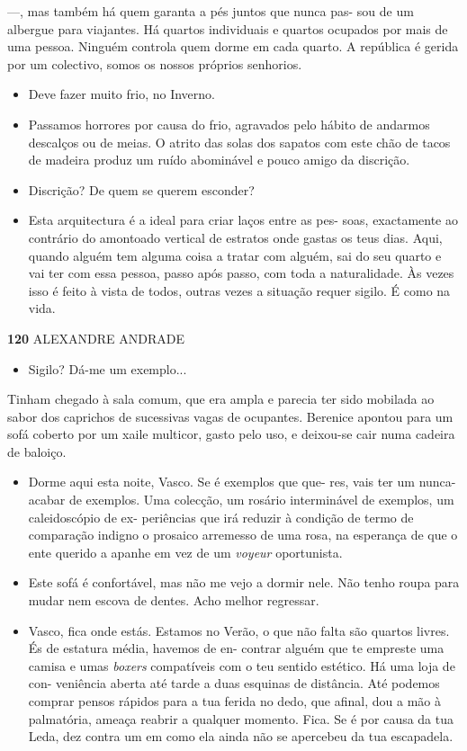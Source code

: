 ---, mas também há quem garanta a pés juntos que nunca pas- sou de um
albergue para viajantes. Há quartos individuais e quartos ocupados por
mais de uma pessoa. Ninguém controla quem dorme em cada quarto. A
república é gerida por um colectivo, somos os nossos próprios senhorios.

\begin{itemize}
\tightlist
\item
  Deve fazer muito frio, no Inverno.
\item
  Passamos horrores por causa do frio, agravados pelo hábito de andarmos
  descalços ou de meias. O atrito das solas dos sapatos com este chão de
  tacos de madeira produz um ruído abominável e pouco amigo da
  discrição.
\item
  Discrição? De quem se querem esconder?
\item
  Esta arquitectura é a ideal para criar laços entre as pes- soas,
  exactamente ao contrário do amontoado vertical de estratos onde gastas
  os teus dias. Aqui, quando alguém tem alguma coisa a tratar com
  alguém, sai do seu quarto e vai ter com essa pessoa, passo após passo,
  com toda a naturalidade. Às vezes isso é feito à vista de todos,
  outras vezes a situação requer sigilo. É como na vida.
\end{itemize}

\textbf{120 }ALEXANDRE ANDRADE

\begin{itemize}
\tightlist
\item
  Sigilo? Dá-me um exemplo...
\end{itemize}

Tinham chegado à sala comum, que era ampla e parecia ter sido mobilada
ao sabor dos caprichos de sucessivas vagas de ocupantes. Berenice
apontou para um sofá coberto por um xaile multicor, gasto pelo uso, e
deixou-se cair numa cadeira de baloiço.

\begin{itemize}
\tightlist
\item
  Dorme aqui esta noite, Vasco. Se é exemplos que que- res, vais ter um
  nunca-acabar de exemplos. Uma colecção, um rosário interminável de
  exemplos, um caleidoscópio de ex- periências que irá reduzir à
  condição de termo de comparação indigno o prosaico arremesso de uma
  rosa, na esperança de que o ente querido a apanhe em vez de um
  \emph{voyeur }oportunista.
\item
  Este sofá é confortável, mas não me vejo a dormir nele. Não tenho
  roupa para mudar nem escova de dentes. Acho melhor regressar.
\item
  Vasco, fica onde estás. Estamos no Verão, o que não falta são quartos
  livres. És de estatura média, havemos de en- contrar alguém que te
  empreste uma camisa e umas \emph{boxers }compatíveis com o teu sentido
  estético. Há uma loja de con- veniência aberta até tarde a duas
  esquinas de distância. Até podemos comprar pensos rápidos para a tua
  ferida no dedo, que afinal, dou a mão à palmatória, ameaça reabrir a
  qualquer momento. Fica. Se é por causa da tua Leda, dez contra um em
  como ela ainda não se apercebeu da tua escapadela.
\end{itemize}


